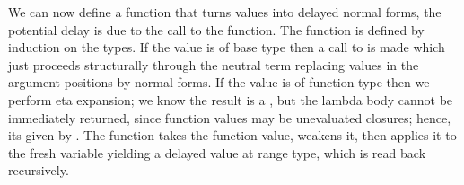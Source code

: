 \documentclass[preliminary,copyright,creativecommons]{eptcs}
\newenvironment{code}{\verbatim}{\endverbatim}
\begin{document}
\noindent
We can now define a function  that turns values into
delayed normal forms, the potential delay is due to the call to the
 function. The  function is defined by
induction on the types. If the value is of base type then a call to
 is made which just proceeds structurally through the
neutral term replacing values in the argument positions by normal
forms. If the value
is of function type then we perform eta expansion; we know the result
is a , but the lambda body cannot be
immediately returned, since function values may be unevaluated
closures; hence, its given  by
.
The function
 takes the function value, weakens it, then applies it to the
fresh variable 
yielding a delayed value at range type, which is read back recursively.

\begin{code}\> \<[12]\>[12]\AgdaSymbol{:}   \AgdaSymbol{\}} \<[26]\>[26]    \<[43]\>[43]   \AgdaSymbol{(}  \AgdaSymbol{)}\<\\
\> \<[12]\>[12]\AgdaSymbol{:}   \AgdaSymbol{\}} \<[26]\>[26]     \<[43]\>[43]   \AgdaSymbol{(}   \AgdaSymbol{)}\<\\
\> \<[12]\>[12]\AgdaSymbol{:}    \AgdaSymbol{\}} \<[26]\>[26]   \AgdaSymbol{(}  \AgdaSymbol{)} \<[43]\>[43]   \AgdaSymbol{(} \AgdaSymbol{(} \AgdaInductiveConstructor{,} \AgdaSymbol{)} \AgdaSymbol{)}\<\end{code}
\end{document}
